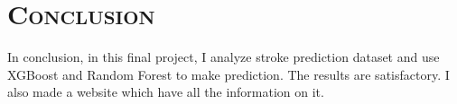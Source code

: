\documentclass[a4paper,12pt]{article}
\begin{document}




\section{\textsc{Conclusion}}
In conclusion, in this final project, I analyze stroke prediction dataset and use XGBoost and Random Forest to make prediction. The results are satisfactory. I also made a website which have all the information on it. 








\end{document}
